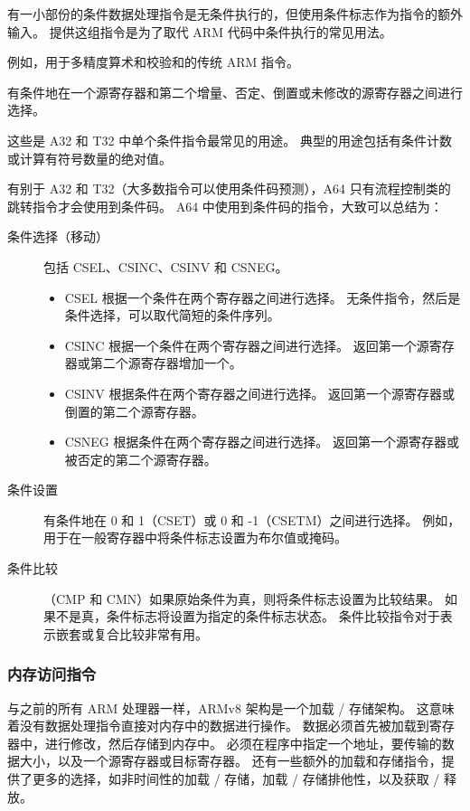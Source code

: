 有一小部份的条件数据处理指令是无条件执行的，但使用条件标志作为指令的额外输入。
提供这组指令是为了取代 ARM 代码中条件执行的常见用法。


例如，用于多精度算术和校验和的传统 ARM 指令。


有条件地在一个源寄存器和第二个增量、否定、倒置或未修改的源寄存器之间进行选择。

这些是 A32 和 T32 中单个条件指令最常见的用途。
典型的用途包括有条件计数或计算有符号数量的绝对值。


有别于 A32 和 T32（大多数指令可以使用条件码预测），A64 只有流程控制类的跳转指令才会使用到条件码。
A64 中使用到条件码的指令，大致可以总结为：

\begin{description}
  \item[条件选择（移动）] 包括 CSEL、CSINC、CSINV 和 CSNEG。
    \begin{itemize}
      \item CSEL 根据一个条件在两个寄存器之间进行选择。
        无条件指令，然后是条件选择，可以取代简短的条件序列。
      \item CSINC 根据一个条件在两个寄存器之间进行选择。
        返回第一个源寄存器或第二个源寄存器增加一个。
      \item CSINV 根据条件在两个寄存器之间进行选择。
        返回第一个源寄存器或倒置的第二个源寄存器。
      \item CSNEG 根据条件在两个寄存器之间进行选择。
        返回第一个源寄存器或被否定的第二个源寄存器。
    \end{itemize}
  \item[条件设置] 有条件地在 0 和 1（CSET）或 0 和 -1（CSETM）之间进行选择。
    例如，用于在一般寄存器中将条件标志设置为布尔值或掩码。
  \item[条件比较]（CMP 和 CMN）如果原始条件为真，则将条件标志设置为比较结果。
    如果不是真，条件标志将设置为指定的条件标志状态。
    条件比较指令对于表示嵌套或复合比较非常有用。
\end{description}

\subsubsection{内存访问指令}

与之前的所有 ARM 处理器一样，ARMv8 架构是一个加载 / 存储架构。
这意味着没有数据处理指令直接对内存中的数据进行操作。
数据必须首先被加载到寄存器中，进行修改，然后存储到内存中。
必须在程序中指定一个地址，要传输的数据大小，以及一个源寄存器或目标寄存器。
还有一些额外的加载和存储指令，提供了更多的选择，如非时间性的加载 / 存储，加载 / 存储排他性，以及获取 / 释放。

